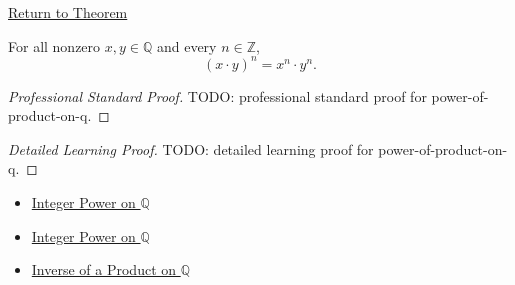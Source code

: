 \newpage
{}
\label{prf:power-of-product-on-q}

\begin{remark*}[Return]
\hyperref[cor:power-of-product-on-q]{Return to Theorem}
\end{remark*}

\begin{corollary*}
For all nonzero $x,y\in\mathbb{Q}$ and every $n\in\mathbb{Z}$,
\[
(x\cdot y)^n=x^n\cdot y^n.
\]
\end{corollary*}

\begin{proof}[Professional Standard Proof]
\LRAProofBodyStart
TODO: professional standard proof for power-of-product-on-q.
\end{proof}

\begin{proof}[Detailed Learning Proof]
\LRAProofBodyStart
TODO: detailed learning proof for power-of-product-on-q.
\end{proof}

\begin{remark*}
\end{remark*}

\begin{dependencies}
\begin{itemize}
  \item \hyperref[def:integer-power-on-q]{Integer Power on $\mathbb{Q}$}
  \item \hyperref[def:integer-power-on-q]{Integer Power on $\mathbb{Q}$}
  \item \hyperref[cor:inverse-of-product-on-q]{Inverse of a Product on $\mathbb{Q}$}
\end{itemize}
\end{dependencies}

\clearpage
